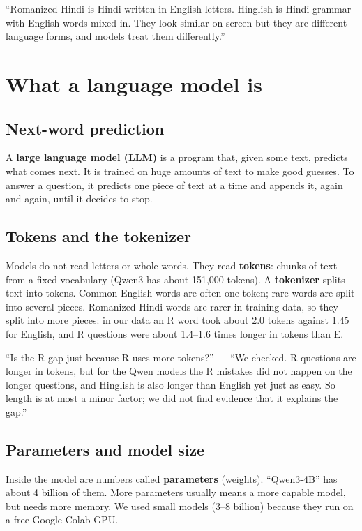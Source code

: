 \documentclass[11pt,a4paper]{article}
\begin{document}
\begin{ifasked}
``Romanized Hindi is Hindi written in English letters. Hinglish is Hindi grammar with English words mixed in. They look similar on screen but they are different language forms, and models treat them differently.''
\end{ifasked}

\section{What a language model is}

\subsection{Next-word prediction}
A \textbf{large language model (LLM)} is a program that, given some text, predicts what comes next. It is trained on huge amounts of text to make good guesses. To answer a question, it predicts one piece of text at a time and appends it, again and again, until it decides to stop.

\subsection{Tokens and the tokenizer}
Models do not read letters or whole words. They read \textbf{tokens}: chunks of text from a fixed vocabulary (Qwen3 has about 151{,}000 tokens). A \textbf{tokenizer} splits text into tokens. Common English words are often one token; rare words are split into several pieces. Romanized Hindi words are rarer in training data, so they split into more pieces: in our data an R word took about 2.0 tokens against 1.45 for English, and R questions were about 1.4--1.6 times longer in tokens than E.

\begin{ifasked}
``Is the R gap just because R uses more tokens?'' --- ``We checked. R questions are longer in tokens, but for the Qwen models the R mistakes did not happen on the longer questions, and Hinglish is also longer than English yet just as easy. So length is at most a minor factor; we did not find evidence that it explains the gap.''
\end{ifasked}

\subsection{Parameters and model size}
Inside the model are numbers called \textbf{parameters} (weights). ``Qwen3-4B'' has about 4 billion of them. More parameters usually means a more capable model, but needs more memory. We used small models (3--8 billion) because they run on a free Google Colab GPU.
\end{document}
